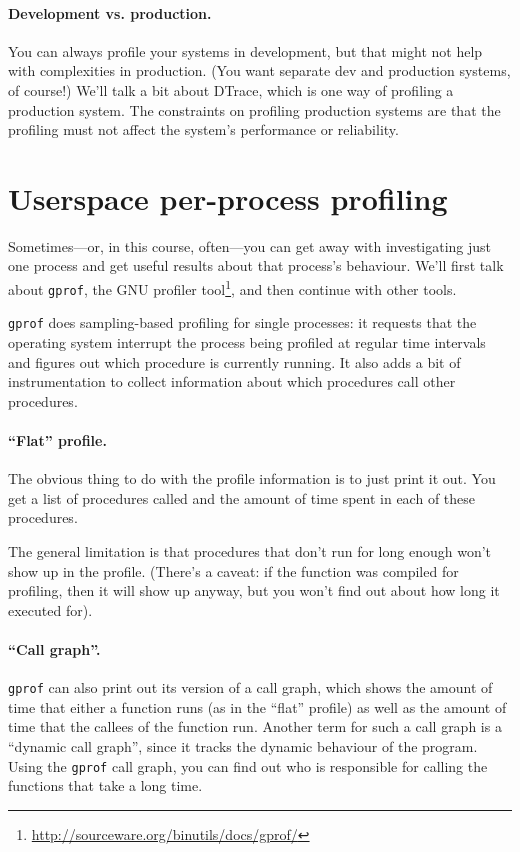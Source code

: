 \documentclass[a4paper]{report}
\begin{document}
\paragraph{Development vs. production.}
You can always profile your systems in development, but that might not
help with complexities in production. (You want separate dev and
production systems, of course!) We'll talk a bit about DTrace, which
is one way of profiling a production system. The constraints on profiling 
production systems are that the profiling must not affect the system's
performance or reliability.

\section*{Userspace per-process profiling}
Sometimes---or, in this course, often---you can get away with
investigating just one process and get useful results about that
process's behaviour.  We'll first talk about {\tt gprof}, the GNU
profiler
tool\footnote{\url{http://sourceware.org/binutils/docs/gprof/}}, and
then continue with other tools.

{\tt gprof} does sampling-based profiling for single processes: it
requests that the operating system interrupt the process being
profiled at regular time intervals and figures out which procedure is
currently running. It also adds a bit of instrumentation to collect
information about which procedures call other procedures.

\paragraph{``Flat'' profile.} The obvious thing to do with the
profile information is to just print it out. You get a list of
procedures called and the amount of time spent in each of these 
procedures.

The general limitation is that procedures that don't run for
long enough won't show up in the profile. (There's a caveat: if
the function was compiled for profiling, then it will show up
anyway, but you won't find out about how long it executed for).

\paragraph{``Call graph''.} {\tt gprof} can also print out 
its version of a call graph, which shows the amount of time that
either a function runs (as in the ``flat'' profile) as well as the
amount of time that the callees of the function run.  Another term for
such a call graph is a ``dynamic call graph'', since it tracks the
dynamic behaviour of the program.  Using the {\tt gprof} call graph,
you can find out who is responsible for calling the functions that
take a long time.
\end{document}
